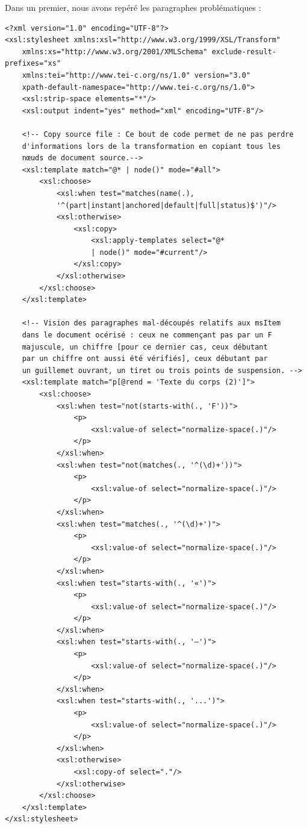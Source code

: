 \documentclass[a4paper,12pt,twoside]{book}
\begin{document}
    Dans un premier, nous avons repéré les paragraphes problématiques :
    
    \begin{verbatim}
<?xml version="1.0" encoding="UTF-8"?>
<xsl:stylesheet xmlns:xsl="http://www.w3.org/1999/XSL/Transform"
    xmlns:xs="http://www.w3.org/2001/XMLSchema" exclude-result-prefixes="xs"
    xmlns:tei="http://www.tei-c.org/ns/1.0" version="3.0"
    xpath-default-namespace="http://www.tei-c.org/ns/1.0">
    <xsl:strip-space elements="*"/>
    <xsl:output indent="yes" method="xml" encoding="UTF-8"/>

    <!-- Copy source file : Ce bout de code permet de ne pas perdre 
    d'informations lors de la transformation en copiant tous les 
    nœuds de document source.-->
    <xsl:template match="@* | node()" mode="#all">
        <xsl:choose>
            <xsl:when test="matches(name(.), 
            '^(part|instant|anchored|default|full|status)$')"/>
            <xsl:otherwise>
                <xsl:copy>
                    <xsl:apply-templates select="@* 
                    | node()" mode="#current"/>
                </xsl:copy>
            </xsl:otherwise>
        </xsl:choose>
    </xsl:template>

    <!-- Vision des paragraphes mal-découpés relatifs aux msItem 
    dans le document océrisé : ceux ne commençant pas par un F 
    majuscule, un chiffre [pour ce dernier cas, ceux débutant 
    par un chiffre ont aussi été vérifiés], ceux débutant par 
    un guillemet ouvrant, un tiret ou trois points de suspension. -->
    <xsl:template match="p[@rend = 'Texte du corps (2)']">
        <xsl:choose>
            <xsl:when test="not(starts-with(., 'F'))">
                <p>
                    <xsl:value-of select="normalize-space(.)"/>
                </p>
            </xsl:when>
            <xsl:when test="not(matches(., '^(\d)+'))">
                <p>
                    <xsl:value-of select="normalize-space(.)"/>
                </p>
            </xsl:when>
            <xsl:when test="matches(., '^(\d)+')">
                <p>
                    <xsl:value-of select="normalize-space(.)"/>
                </p>
            </xsl:when>
            <xsl:when test="starts-with(., '«')">
                <p>
                    <xsl:value-of select="normalize-space(.)"/>
                </p>
            </xsl:when>
            <xsl:when test="starts-with(., '—')">
                <p>
                    <xsl:value-of select="normalize-space(.)"/>
                </p>
            </xsl:when>
            <xsl:when test="starts-with(., '...')">
                <p>
                    <xsl:value-of select="normalize-space(.)"/>
                </p>
            </xsl:when>
            <xsl:otherwise>
                <xsl:copy-of select="."/>
            </xsl:otherwise>
        </xsl:choose>
    </xsl:template>
</xsl:stylesheet>
    \end{verbatim}
    
\end{document}
